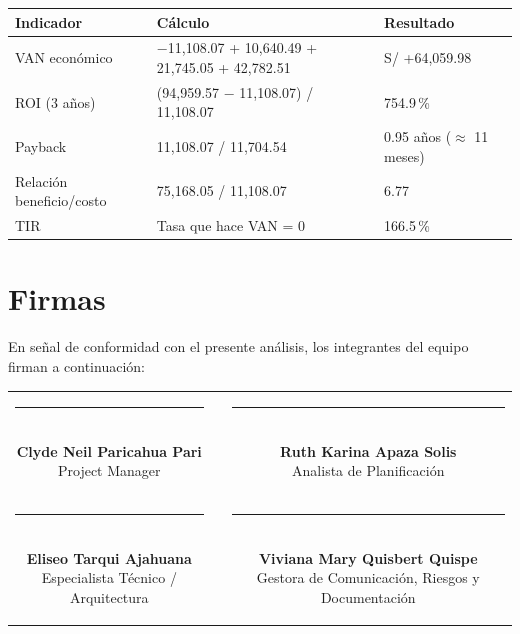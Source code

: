 \documentclass[11pt,a4paper]{article}
\begin{document}
\vspace{0.15cm}
{\small
\noindent\begin{tabularx}{\textwidth}{@{}P{4.0cm} L Q{3.1cm}@{}}
\toprule
{}
\textbf{Indicador} & \textbf{Cálculo} & \textbf{Resultado} \\
\midrule
VAN económico & $-$11,108.07 + 10,640.49 + 21,745.05 + 42,782.51 & S/ +64,059.98 \\
ROI (3 años) & (94,959.57 $-$ 11,108.07) / 11,108.07 & 754.9\,\% \\
Payback & 11,108.07 / 11,704.54 & 0.95 años ($\approx$ 11 meses) \\
Relación beneficio/costo & 75,168.05 / 11,108.07 & 6.77 \\
TIR & Tasa que hace VAN = 0 & 166.5\,\% \\
\bottomrule
\end{tabularx}
}

\section{Firmas}
\noindent En señal de conformidad con el presente análisis, los integrantes del equipo firman a continuación:

\vspace{1.5cm}
\begin{center}
\begin{tabular}{c c c}
    \parbox{6.5cm}{\centering \rule{6.0cm}{0.6pt}\\[5pt] \textbf{Clyde Neil Paricahua Pari}\\[2pt] {\footnotesize Project Manager}}
    & \hspace{0.8cm} &
    \parbox{6.5cm}{\centering \rule{6.0cm}{0.6pt}\\[5pt] \textbf{Ruth Karina Apaza Solis}\\[2pt] {\footnotesize Analista de Planificación}}
    \\[2.0cm]
    \parbox{6.5cm}{\centering \rule{6.0cm}{0.6pt}\\[5pt] \textbf{Eliseo Tarqui Ajahuana}\\[2pt] {\footnotesize Especialista Técnico / Arquitectura}}
    & \hspace{0.8cm} &
    \parbox{6.5cm}{\centering \rule{6.0cm}{0.6pt}\\[5pt] \textbf{Viviana Mary Quisbert Quispe}\\[2pt] {\footnotesize Gestora de Comunicación, Riesgos y Documentación}}
\end{tabular}
\end{center}
\end{document}
